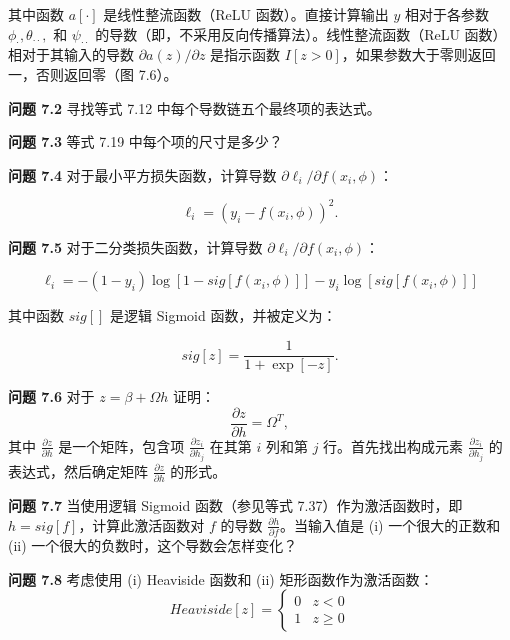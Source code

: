 \documentclass[lang=cn,newtx,10pt,scheme=chinese]{elegantbook}
\begin{document}
其中函数 \(a[\cdot]\) 是线性整流函数（ReLU 函数）。直接计算输出 \(y\) 相对于各参数 \(\phi_\cdot, \theta_{\cdot\cdot},\) 和 \(\psi_{\cdot\cdot}\) 的导数（即，不采用反向传播算法）。线性整流函数（ReLU 函数）相对于其输入的导数 \(\partial a(z)/\partial z\) 是指示函数 \(I[z > 0]\)，如果参数大于零则返回一，否则返回零（图 7.6）。

\textbf{问题 7.2} 寻找等式 7.12 中每个导数链五个最终项的表达式。

\textbf{问题 7.3} 等式 7.19 中每个项的尺寸是多少？

\textbf{问题 7.4} 对于最小平方损失函数，计算导数 \(\partial\ell_i/\partial f(x_i, \phi)\)：

\begin{equation}
\ell_i = (y_i - f(x_i, \phi))^2. 
\end{equation}

\textbf{问题 7.5} 对于二分类损失函数，计算导数 \(\partial\ell_i/\partial f(x_i, \phi)\)：

\begin{equation}
\ell_i = -(1 - y_i)\log [ 1 - sig[f(x_i, \phi)] ] - y_i \log [sig[f(x_i, \phi)] ] 
\end{equation}

其中函数 \(sig[]\) 是逻辑 Sigmoid 函数，并被定义为：

\begin{equation}
sig[z] = \frac{1}{1 + \exp[-z]}. 
\end{equation}


\textbf{问题 7.6} 对于 \(z = \beta + \Omega h\) 证明：
\begin{equation*}
\frac{\partial z}{\partial h} = \Omega^T,
\end{equation*}
其中 \(\frac{\partial z}{\partial h}\) 是一个矩阵，包含项 \(\frac{\partial z_i}{\partial h_j}\) 在其第 \(i\) 列和第 \(j\) 行。首先找出构成元素 \(\frac{\partial z_i}{\partial h_j}\) 的表达式，然后确定矩阵 \(\frac{\partial z}{\partial h}\) 的形式。

\textbf{问题 7.7} 当使用逻辑 Sigmoid 函数（参见等式 7.37）作为激活函数时，即 \(h = sig[f]\)，计算此激活函数对 \(f\) 的导数 \(\frac{\partial h}{\partial f}\)。当输入值是 (i) 一个很大的正数和 (ii) 一个很大的负数时，这个导数会怎样变化？

\textbf{问题 7.8} 考虑使用 (i) Heaviside 函数和 (ii) 矩形函数作为激活函数：
\begin{equation}
Heaviside[z] = \begin{cases}
0 & z < 0 \\
1 & z \geq 0
\end{cases} 
\end{equation}
\end{document}
